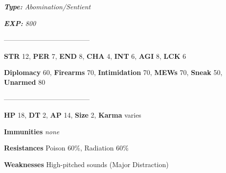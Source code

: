 \documentclass[11pt,a4paper,twocolumn]{book}
\begin{document}
	\noindent
	\emph{\textbf{Type:} Abomination/Sentient}
	
	\noindent
	\emph{\textbf{EXP:} 800}
	
%		
%	
%		

	--------------------------------------

	\noindent
	\textbf{STR} 12, \textbf{PER} 7, \textbf{END} 8, \textbf{CHA} 4, \textbf{INT} 6, \textbf{AGI} 8, \textbf{LCK} 6
	
	\noindent
	\textbf{Diplomacy} 60, \textbf{Firearms} 70, \textbf{Intimidation} 70, \textbf{MEWs} 70, \textbf{Sneak} 50, \textbf{Unarmed} 80
	
	--------------------------------------
	
	\noindent
	\textbf{HP} 18, \textbf{DT} 2, \textbf{AP} 14, \textbf{Size} 2, \textbf{Karma} varies
	
	
	\noindent
	\textbf{Immunities} \emph{none} %
	
	\noindent
	\textbf{Resistances} Poison 60\%, Radiation 60\%%
	
	\noindent
	\textbf{Weaknesses} High-pitched sounds (Major Distraction)%
	
\end{document}
